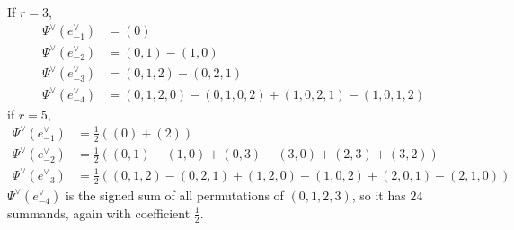 %
\begin{example} If $r=3$,
\begin{align*}
	\Psi^\vee(e_{-1}^\vee) &= (0)
	\\
	\Psi^\vee(e_{-2}^{\vee}) &= (0,1)-(1,0)
	\\
	\Psi^\vee(e_{-3}^{\vee}) &= (0,1,2) - (0,2,1)
\\
	\Psi^\vee(e_{-4}^{\vee}) &= (0,1,2,0) - (0,1,0,2) + (1,0,2,1) - (1,0,1,2)
\end{align*}
if $r= 5$,
\begin{align*}
	\Psi^\vee(e^\vee_{-1}) &= \frac{1}{2}\left((0) + (2)\right)
	\\
	\Psi^\vee(e^\vee_{-2}) &= \frac{1}{2}\left((0,1) - (1,0) + (0,3) - (3,0) + (2,3) + (3,2)\right)
	\\
	\Psi^\vee(e^\vee_{-3}) &= \frac{1}{2}\left((0,1,2) -(0,2,1) + (1,2,0) - (1,0,2) + (2,0,1) - (2,1,0)\right)
\end{align*}
$\Psi^\vee(e^\vee_{-4})$ is the signed sum of all permutations of $(0,1,2,3)$, so it has $24$ summands, again with coefficient $\frac{1}{2}$.
\end{example}

